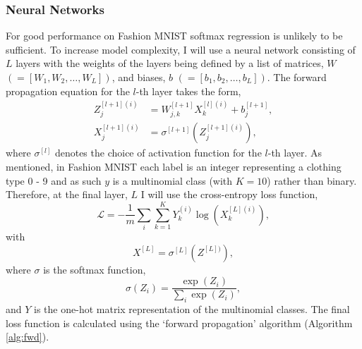 \documentclass[nohyperref]{article}
\theoremstyle{plain}
\theoremstyle{definition}
\theoremstyle{remark}
\begin{document}
\subsubsection*{Neural Networks}
For good performance on Fashion MNIST softmax regression is unlikely to be sufficient. To increase model complexity, I will use a neural network consisting of $L$ layers with the weights of the layers being defined by a list of matrices, $W$ $(=[W_1,W_2,\ldots,W_L])$, and biases, $b$ $(=[b_1,b_2,\ldots,b_L])$. The forward propagation equation for the $l$-th layer takes the form,
\begin{align}
Z^{[l+1](i)}_j&=W^{[l+1]}_{j,k}X^{[l](i)}_k+b^{[l+1]}_j,  \label{propZ}\\
X^{[l+1](i)}_j&=\sigma^{[l+1]}(Z^{[l+1](i)}_j)\label{propX},
\end{align}
where $\sigma^{[l]}$ denotes the choice of activation function for the $l$-th layer. As mentioned, in Fashion MNIST each label is an integer representing a clothing type 0 - 9 and as such $y$ is a multinomial class (with $K=10$) rather than binary.  Therefore, at  the final layer, $L$ I will use the cross-entropy loss function,
\begin{equation}
\mathcal{L}=-\frac{1}{m}\sum_{i}\sum_{k=1}^{K} Y^{(i)}_k\log{(X^{[L](i)}_k)},\label{celossfunc}
\end{equation}
with
\begin{equation}
X^{[L]}=\sigma^{[L]}{(Z^{[L])})},\label{XL_defn}
\end{equation}
where $\sigma$ is the softmax function, 
\begin{equation}
\sigma{(Z_i)}=\frac{\exp{(Z_i)}}{\sum_i \exp{(Z_i)}},\label{softmax}
\end{equation}
and $Y$ is the one-hot matrix representation of the multinomial classes. The final loss function is calculated using the `forward propagation' algorithm (Algorithm \ref{alg:fwd}).
\end{document}
